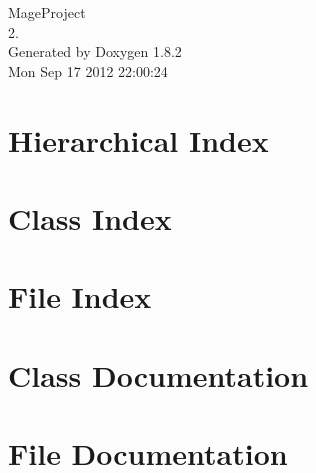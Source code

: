 \documentclass{book}
\begin{document}
\hypersetup{pageanchor=false,citecolor=blue}
\begin{titlepage}
\vspace*{7cm}
\begin{center}
{\Large Mage\-Project \\[1ex]\large 2. }\\
\vspace*{1cm}
{\large Generated by Doxygen 1.8.2}\\
\vspace*{0.5cm}
{\small Mon Sep 17 2012 22:00:24}\\
\end{center}
\end{titlepage}
\clearemptydoublepage
{}
\tableofcontents
\clearemptydoublepage
{}
\hypersetup{pageanchor=true,citecolor=blue}
\chapter{Hierarchical Index}

\chapter{Class Index}

\chapter{File Index}

\chapter{Class Documentation}
















\chapter{File Documentation}





















\printindex
\end{document}
